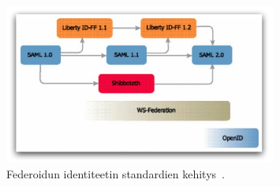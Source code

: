 \documentclass[finnish,gradu]{tktltiki}
\begin{document}
  \begin{figure}
    \centering
    \includegraphics[width=0.8\textwidth]{images/federoidun_id_standardien_kehitys.jpg}
    \caption{Federoidun identiteetin standardien kehitys~\cite{ping_identity_primer_federated_id_2010}.}
    \label{fig:federoidun_id_standardien_kehitys}
  \end{figure}





\end{document}
